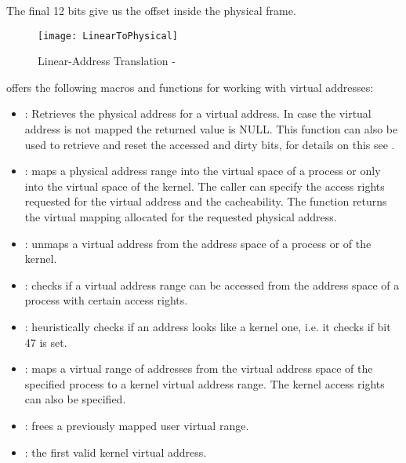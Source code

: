 \begin{appendices}
The final 12 bits give us the offset inside the physical frame.

\begin{figure}
	\centering
	\texttt{[image: LinearToPhysical]}
		\caption{Linear-Address Translation - \cite{intelSys}}
	\label{fig:VaToPa}
\end{figure}

\projectname offers the following macros and functions for working with virtual addresses:

\begin{itemize}
	\item {}: Retrieves the physical address for a virtual address. In
case the virtual address is not mapped the returned value is NULL. This function can also be used
to retrieve and reset the accessed and dirty bits, for details on this see .

	\item {}: maps a physical address range into the virtual space of a process 
or only into the virtual space of the kernel. The caller can specify the access rights requested for
the virtual address and the cacheability. The function returns the virtual mapping allocated for the
requested physical address.

	\item {}: unmaps a virtual address from the address space of a process or
of the kernel.

	\item {}: checks if a virtual address range can be accessed from the
address space of a process with certain access rights.

	\item {}: heuristically checks if an address looks like a kernel one, i.e.
it checks if bit 47 is set.

	\item {}: maps a virtual range of addresses from the
virtual address space of the specified process to a kernel virtual address range. The kernel access
rights can also be specified.

	\item {}: frees a previously mapped user virtual
range.

	\item {}: the first valid kernel virtual address.


\end{itemize}
\end{appendices}
